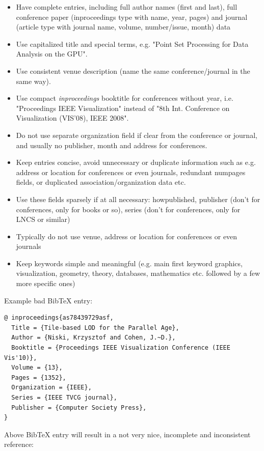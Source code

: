 \documentclass[11pt, a4paper,oneside,chapterprefix=false]{scrbook}
\begin{document}
\begin{itemize}
\item Have complete entries, including full author names (first and last), full conference paper (inproceedings type with name, year, pages) and journal (article type with journal name, volume, number/issue, month) data
\item Use capitalized title and special terms, e.g. "Point Set Processing for Data Analysis on the {GPU}".
\item Use consistent venue description (name the same conference/journal in the same way).
\item Use compact \emph{inproceedings} booktitle for conferences without year, i.e. "Proceedings IEEE Visualization" instead of "8th Int. Conference on Visualization (VIS'08), IEEE 2008".
\item Do not use separate organization field if clear from the conference or journal, and usually no publisher, month and address for conferences.
\item Keep entries concise, avoid unnecessary or duplicate information such as e.g. address or location for conferences or even journals, redundant numpages fields, or duplicated association/organization data etc.
\item Use these fields sparsely if at all necessary: howpublished, publisher (don't for conferences, only for books or so), series (don't for conferences, only for LNCS or similar)
\item Typically do not use venue, address or location for conferences or even journals
\item Keep keywords simple and meaningful (e.g. main first keyword graphics, visualization, geometry, theory, databases, mathematics etc. followed by a few more specific ones)
\end{itemize}

\noindent
Example bad BibTeX entry:

\begin{verbatim}
@ inproceedings{as78439729asf,
  Title = {Tile-based LOD for the Parallel Age},
  Author = {Niski, Krzysztof and Cohen, J.~D.},
  Booktitle = {Proceedings IEEE Visualization Conference (IEEE Vis'10)},
  Volume = {13},
  Pages = {1352},
  Organization = {IEEE},
  Series = {IEEE TVCG journal},
  Publisher = {Computer Society Press},
}
\end{verbatim}

\noindent
Above BibTeX entry will result in a not very nice, incomplete and inconsistent reference:
\end{document}
